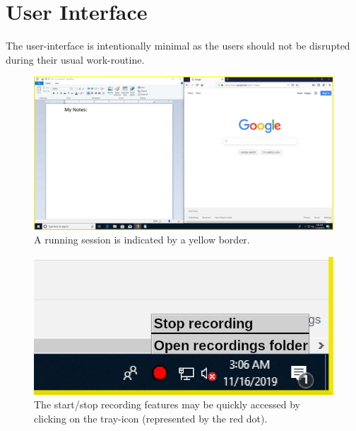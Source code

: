 \section{User Interface}
The \gls{user}-interface is intentionally minimal as the \glspl{user} should not be disrupted during their usual work-routine.
\begin{figure}[h!]
  \includegraphics[width=1.00\textwidth]{resources/ui_recordindicator.jpg}
  \centering
  \caption{A running \gls{session} is indicated by a yellow border.}
  \label{fig:ui_recordindicator}
\end{figure}
\begin{figure}[h!]
  \includegraphics[width=1.00\textwidth]{resources/ui_trayicon.jpg}
  \centering
  \caption{The start/stop recording features may be quickly accessed by clicking on the tray-icon (represented by the red dot).}
  \label{fig:ui_trayicon}
\end{figure}